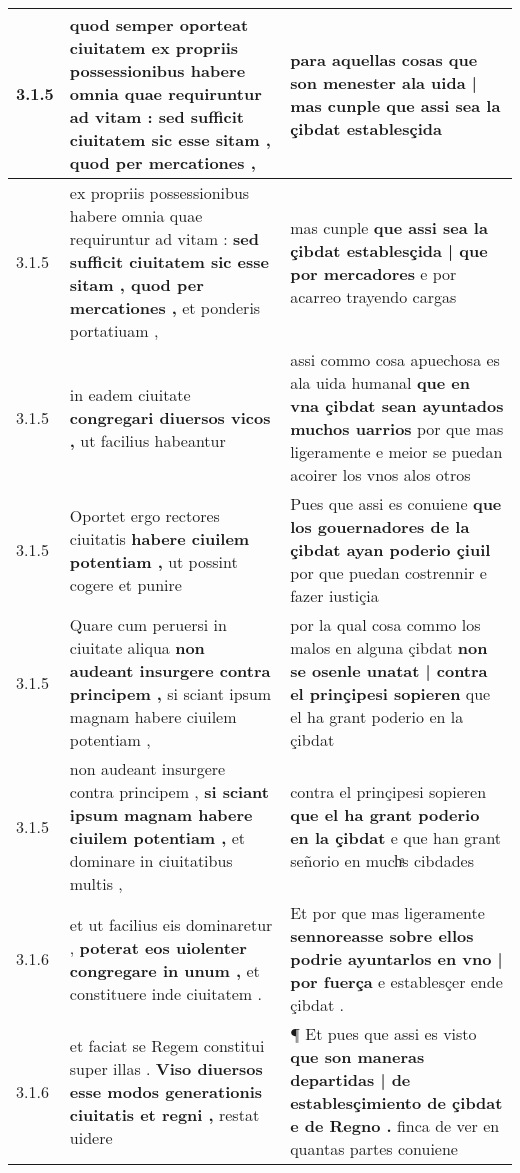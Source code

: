 \begin{tabular}{|p{1cm}|p{6.5cm}|p{6.5cm}|}
3.1.5 & quod semper oporteat ciuitatem \textbf{ ex propriis possessionibus habere omnia quae requiruntur ad vitam : } sed sufficit ciuitatem sic esse sitam , quod per mercationes , & para aquellas cosas \textbf{ que son menester ala uida | mas cunple } que assi sea la çibdat establesçida \\\hline
3.1.5 & ex propriis possessionibus habere omnia quae requiruntur ad vitam : \textbf{ sed sufficit ciuitatem sic esse sitam , quod per mercationes , } et ponderis portatiuam , & mas cunple \textbf{ que assi sea la çibdat establesçida | que por mercadores } e por acarreo trayendo cargas \\\hline
3.1.5 & in eadem ciuitate \textbf{ congregari diuersos vicos , } ut facilius habeantur & assi commo cosa apuechosa es ala uida humanal \textbf{ que en vna çibdat sean ayuntados muchos uarrios } por que mas ligeramente e meior se puedan acoirer los vnos alos otros \\\hline
3.1.5 & Oportet ergo rectores ciuitatis \textbf{ habere ciuilem potentiam , } ut possint cogere et punire & Pues que assi es conuiene \textbf{ que los gouernadores de la çibdat ayan poderio çiuil } por que puedan costrennir e fazer iustiçia \\\hline
3.1.5 & Quare cum peruersi in ciuitate aliqua \textbf{ non audeant insurgere contra principem , } si sciant ipsum magnam habere ciuilem potentiam , & por la qual cosa commo los malos en alguna çibdat \textbf{ non se osenle unatat | contra el prinçipesi sopieren } que el ha grant poderio en la çibdat \\\hline
3.1.5 & non audeant insurgere contra principem , \textbf{ si sciant ipsum magnam habere ciuilem potentiam , } et dominare in ciuitatibus multis , & contra el prinçipesi sopieren \textbf{ que el ha grant poderio en la çibdat } e que han grant señorio en muchͣs cibdades \\\hline
3.1.6 & et ut facilius eis dominaretur , \textbf{ poterat eos uiolenter congregare in unum , } et constituere inde ciuitatem . & Et por que mas ligeramente \textbf{ sennoreasse sobre ellos podrie ayuntarlos en vno | por fuerça } e establesçer ende çibdat . \\\hline
3.1.6 & et faciat se Regem constitui super illas . \textbf{ Viso diuersos esse modos generationis ciuitatis et regni , } restat uidere & ¶ Et pues que assi es visto \textbf{ que son maneras departidas | de establesçimiento de çibdat e de Regno . } finca de ver en quantas partes conuiene \\\hline

\end{tabular}
